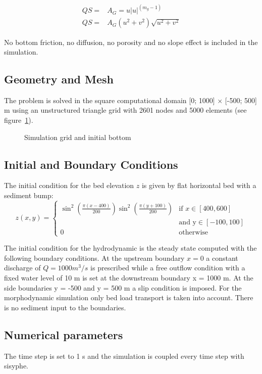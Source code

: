 \begin{equation}
\begin{array}{ll}
     QS = &A_G = u |u|^{(m_g-1)} \\
     QS = & A_G (u^2+v^2)  \sqrt{u^2 + v^2}
\end{array}
\end{equation}


No bottom friction, no diffusion, no porosity and no slope effect is included in the simulation.
%
\subsection{Geometry and Mesh}
%
The problem is solved in the
square computational domain [0; 1000] $\times$ [-500; 500] m using an unstructured triangle grid with 2601 nodes and
5000 elements (see figure~\ref{ini}).
\begin{figure} [!h] %
\centering
{}
 \caption{Simulation grid and initial bottom}\label{ini}
\end{figure}

%
\subsection{Initial and Boundary Conditions}
%
The initial condition for the
bed elevation $z$ is given by flat horizontal bed with a sediment bump:
\begin{equation}
z(x,y) = \left\{
  \begin{array}{lr}
\sin^2 (\frac{\pi (x-400)}{200}) \sin^2 (\frac{\pi (y+100)}{200}) & \text{if } x \in [400, 600] \\
& \text{and y} \in [-100,100] \\
0 & \text{otherwise}
  \end{array}
\right.
\end{equation}

The initial condition for the hydrodynamic is the steady state computed with the following boundary conditions.
At the upstream boundary $x = 0$ a constant discharge of $Q =
1000 m^3/s$ is prescribed while a free outflow condition with a fixed water level of 10 m
is set at the downstream boundary
x = 1000 m. At the side boundaries y = -500 and y = 500 m  a
slip condition is imposed.
For the morphodynamic simulation only bed load transport is taken into account. There is no sediment
input to the boundaries.


%
\subsection{Numerical parameters}
%
The time step is set to 1 s and the simulation is coupled every time step with sisyphe.


